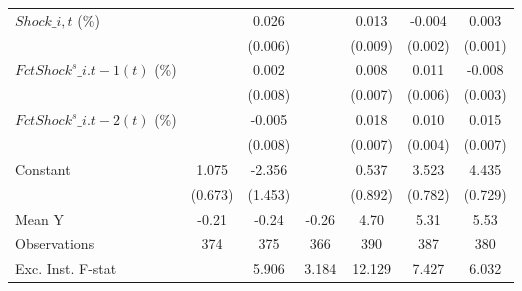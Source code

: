 {\begin{tabular}{l*{6}{c}}
\addlinespace
$ Shock\_{i,t}$ (\%) &                     &       0.026\sym{***}&                     &       0.013         &      -0.004\sym{**} &       0.003\sym{***}\\
                    &                     &     (0.006)         &                     &     (0.009)         &     (0.002)         &     (0.001)         \\
\addlinespace
$ FctShock^s\_{i.t-1}(t)$ (\%)&                     &       0.002         &                     &       0.008         &       0.011\sym{*}  &      -0.008\sym{**} \\
                    &                     &     (0.008)         &                     &     (0.007)         &     (0.006)         &     (0.003)         \\
\addlinespace
$ FctShock^s\_{i.t-2}(t)$ (\%)&                     &      -0.005         &                     &       0.018\sym{**} &       0.010\sym{**} &       0.015\sym{**} \\
                    &                     &     (0.008)         &                     &     (0.007)         &     (0.004)         &     (0.007)         \\
\addlinespace
Constant            &       1.075         &      -2.356         &                     &       0.537         &       3.523\sym{***}&       4.435\sym{***}\\
                    &     (0.673)         &     (1.453)         &                     &     (0.892)         &     (0.782)         &     (0.729)         \\
\midrule
Mean Y              &       -0.21         &       -0.24         &       -0.26         &        4.70         &        5.31         &        5.53         \\
Observations        &         374         &         375         &         366         &         390         &         387         &         380         \\
Exc. Inst. F-stat   &                     &       5.906         &       3.184         &      12.129         &       7.427         &       6.032         \\
\bottomrule
\end{tabular}
}
